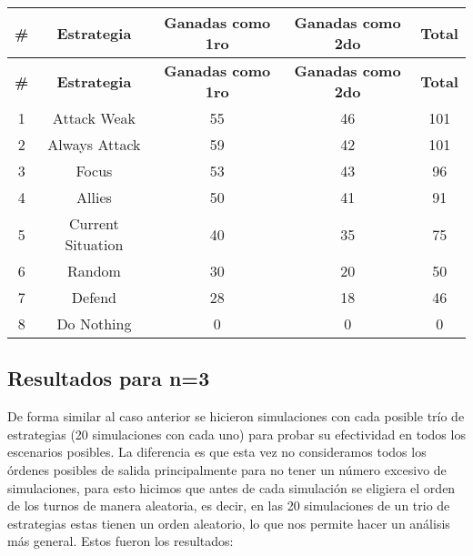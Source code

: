 \documentclass[11pt]{article}
\begin{document}
            \begin{longtable}{|c|c|c|c|c|}
                \hline \textbf{\#}  & \textbf{Estrategia}  & \textbf{Ganadas como 1ro} & \textbf{Ganadas como 2do} & \textbf{Total} \\ 
                \endfirsthead
                \hline \textbf{\#}  & \textbf{Estrategia}  & \textbf{Ganadas como 1ro} & \textbf{Ganadas como 2do} & \textbf{Total} \\ 
                \endhead
                \hline   1   &    Attack Weak    &        55        &        46        &  101  \\
                \hline   2   &   Always Attack   &        59        &        42        &  101  \\
                \hline   3   &       Focus       &        53        &        43        &  96   \\
                \hline   4   &      Allies       &        50        &        41        &  91   \\
                \hline   5   & Current Situation &        40        &        35        &  75   \\
                \hline   6   &      Random       &        30        &        20        &  50   \\
                \hline   7   &      Defend       &        28        &        18        &  46   \\
                \hline   8   &    Do Nothing     &        0         &        0         &   0   \\
                \hline
            \end{longtable}

            \subsection{Resultados para n=3}
            De forma similar al caso anterior se hicieron simulaciones con cada posible trío de 
            estrategias (20 simulaciones con cada uno) para probar su efectividad en todos los 
            escenarios posibles. La diferencia es que esta vez no consideramos todos los órdenes 
            posibles de salida principalmente para no tener un número excesivo de simulaciones, 
            para esto hicimos que antes de cada simulación se eligiera el orden de los turnos de 
            manera aleatoria, es decir, en las 20 simulaciones de un trio de estrategias estas 
            tienen un orden aleatorio, lo que nos permite hacer un análisis más general. Estos 
            fueron los resultados:
\end{document}
